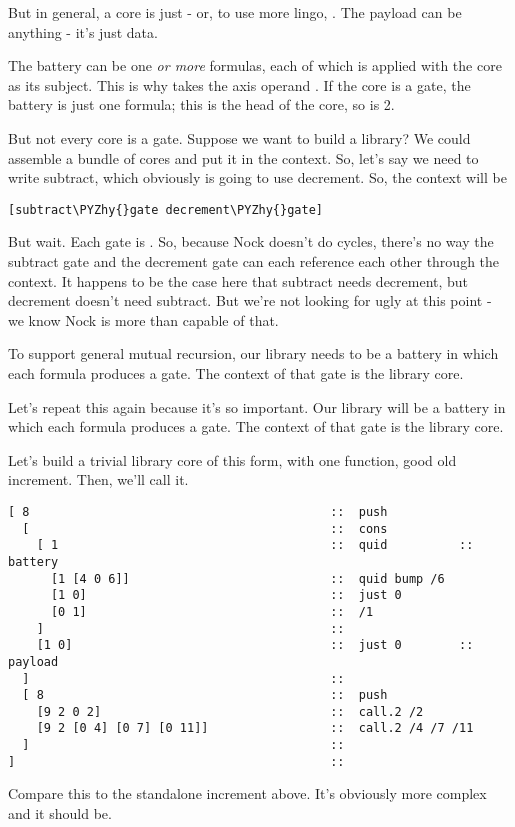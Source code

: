 But in general, a core is just  - or, to use more
lingo, .  The payload can be anything - it's
just data.

The battery can be one \emph{or more} formulas, each of which is
applied with the core as its subject.  This is why  takes the
axis operand .  If the core is a gate, the battery is just one
formula; this is the head of the core, so  is 2.

But not every core is a gate.  Suppose we want to build a
library?  We could assemble a bundle of cores and put it in
the context.  So, let's say we need to write subtract, which
obviously is going to use decrement.  So, the context will be

\begin{framed_shaded}
\begin{Verbatim}[fontsize=\relsize{-2.5},commandchars=\\\{\}]
[subtract\PYZhy{}gate decrement\PYZhy{}gate]
\end{Verbatim}
\end{framed_shaded}
But wait.  Each gate is .  So, because
Nock doesn't do cycles, there's no way the subtract gate and the
decrement gate can each reference each other through the context.
It happens to be the case here that subtract needs decrement, but
decrement doesn't need subtract.  But we're not looking for ugly
at this point - we know Nock is more than capable of that.

To support general mutual recursion, our library needs to be a
battery in which each formula produces a gate.  The context of
that gate is the library core.

Let's repeat this again because it's so important.  Our library
will be a battery in which each formula produces a gate.  The
context of that gate is the library core.

Let's build a trivial library core of this form, with one
function, good old increment.  Then, we'll call it.

\begin{framed_shaded}
\begin{Verbatim}[fontsize=\relsize{-2.5},commandchars=\\\{\}]
[ 8                                          ::  push
  [                                          ::  cons
    [ 1                                      ::  quid          ::  battery
      [1 [4 0 6]]                            ::  quid bump /6
      [1 0]                                  ::  just 0
      [0 1]                                  ::  /1
    ]                                        ::
    [1 0]                                    ::  just 0        ::  payload
  ]                                          ::  
  [ 8                                        ::  push
    [9 2 0 2]                                ::  call.2 /2
    [9 2 [0 4] [0 7] [0 11]]                 ::  call.2 /4 /7 /11
  ]                                          ::
]                                            ::
\end{Verbatim}
\end{framed_shaded}
Compare this to the standalone increment above.  It's obviously
more complex and it should be.

